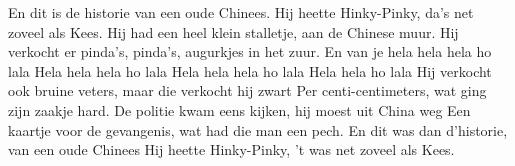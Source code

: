 \beginverse
En dit is de historie van een oude Chinees.
Hij heette Hinky-Pinky, da’s net zoveel als Kees.
Hij had een heel klein stalletje, aan de Chinese muur.
Hij verkocht er pinda’s, pinda’s, augurkjes in het zuur.
\endverse
\beginchorus
En van je hela hela hela ho lala
Hela hela hela ho lala
Hela hela hela ho lala
Hela hela ho lala
\endchorus
\beginverse
Hij verkocht ook bruine veters, maar die verkocht hij zwart
Per centi-centimeters, wat ging zijn zaakje hard.
De politie kwam eens kijken, hij moest uit China weg
Een kaartje voor de gevangenis, wat had die man een pech.
\endverse
\beginverse
En dit was dan d’historie, van een oude Chinees
Hij heette Hinky-Pinky, 't was net zoveel als Kees. 
\endverse
\endsong